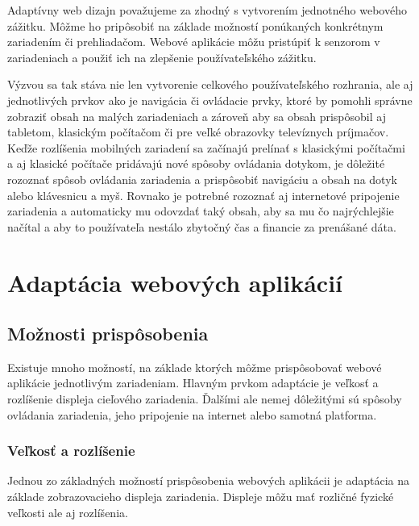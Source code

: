 Adaptívny web dizajn považujeme za zhodný s vytvorením jednotného webového zážitku. Môžme ho pripôsobiť na základe možností ponúkaných konkrétnym zariadením či prehliadačom. Webové aplikácie môžu pristúpiť k senzorom v zariadeniach a použiť ich na zlepšenie používateľského zážitku.

Výzvou sa tak stáva nie len vytvorenie celkového používateľského rozhrania, ale aj jednotlivých prvkov ako je navigácia či ovládacie prvky, ktoré by pomohli správne zobraziť obsah na malých zariadeniach a zároveň aby sa obsah prispôsobil aj tabletom, klasickým počítačom či pre veľké obrazovky televíznych príjmačov. Keďže rozlíšenia mobilných zariadení sa začínajú prelínať s klasickými počítačmi a aj klasické počítače pridávajú nové spôsoby ovládania dotykom, je dôležité rozoznať spôsob ovládania zariadenia a prispôsobiť navigáciu a obsah na dotyk alebo klávesnicu a myš. Rovnako je potrebné rozoznať aj internetové pripojenie zariadenia a automaticky mu odovzdať taký obsah, aby sa mu čo najrýchlejšie načítal a aby to používateľa nestálo zbytočný čas a financie za prenášané dáta.






\section{Adaptácia webových aplikácií} %
\label{sec:adapt_cia}

\subsection{Možnosti prispôsobenia} %
\label{sub:mo_nosti_prisp_sobenia}

Existuje mnoho možností, na základe ktorých môžme prispôsobovať webové aplikácie jednotlivým zariadeniam. Hlavným prvkom adaptácie je veľkosť a rozlíšenie displeja cieľového zariadenia. Ďalšími ale nemej dôležitými sú spôsoby ovládania zariadenia, jeho pripojenie na internet alebo samotná platforma.

\subsubsection{Veľkosť a rozlíšenie} %
\label{ssub:ve_kos_a_rozl_enie}

Jednou zo základných možností prispôsobenia webových aplikácii je adaptácia na základe zobrazovacieho displeja zariadenia. Displeje môžu mať rozličné fyzické veľkosti ale aj rozlíšenia.

